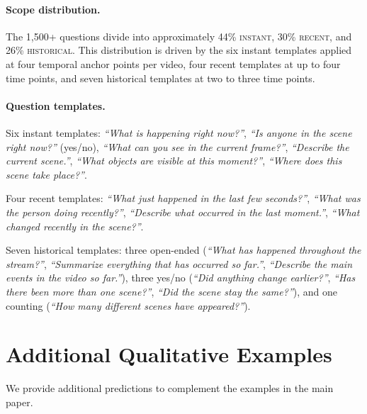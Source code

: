\paragraph{Scope distribution.}
The 1{,}500+ questions divide into approximately 44\% \textsc{instant}, 30\% \textsc{recent}, and 26\% \textsc{historical}.
This distribution is driven by the six instant templates applied at four temporal anchor points per video, four recent templates at up to four time points, and seven historical templates at two to three time points.

\paragraph{Question templates.}
Six instant templates: \emph{``What is happening right now?''}, \emph{``Is anyone in the scene right now?''} (yes/no), \emph{``What can you see in the current frame?''}, \emph{``Describe the current scene.''}, \emph{``What objects are visible at this moment?''}, \emph{``Where does this scene take place?''}.

Four recent templates: \emph{``What just happened in the last few seconds?''}, \emph{``What was the person doing recently?''}, \emph{``Describe what occurred in the last moment.''}, \emph{``What changed recently in the scene?''}.

Seven historical templates: three open-ended (\emph{``What has happened throughout the stream?''}, \emph{``Summarize everything that has occurred so far.''}, \emph{``Describe the main events in the video so far.''}), three yes/no (\emph{``Did anything change earlier?''}, \emph{``Has there been more than one scene?''}, \emph{``Did the scene stay the same?''}), and one counting (\emph{``How many different scenes have appeared?''}).

\section{Additional Qualitative Examples}
\label{sec:suppl_qual}

We provide additional predictions to complement the examples in the main paper.


